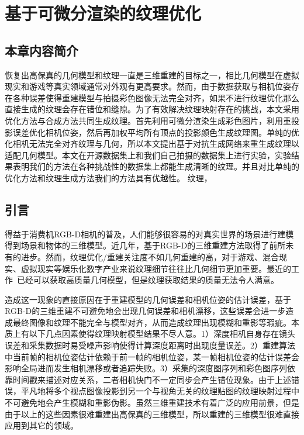 \chapter{基于可微分渲染的纹理优化}
\section{本章内容简介}

恢复出高保真的几何模型和纹理一直是三维重建的目标之一，相比几何模型在虚拟现实和游戏等真实领域通常对外观有更高要求。然而，由于数据获取与相机位姿存在各种误差使得重建模型与拍摄彩色图像无法完全对齐，如果不进行纹理优化那么直接生成的纹理会存在错位和缝隙。为了有效解决纹理映射存在的挑战，本文采用优化方法与合成方法共同生成纹理。首先利用可微分渲染生成彩色图片，利用重投影误差优化相机位姿，然后再加权平均所有顶点的投影颜色生成纹理图。单纯的优化相机无法完全对齐纹理与几何，所以本文提出基于对抗生成网络来重生成纹理以适配几何模型。本文在开源数据集上和我们自己拍摄的数据集上进行实验，实验结果表明我们的方法在各种挑战性的数据集上都能生成清晰的纹理。并且对比单纯的优化方法和纹理生成方法我们的方法具有优越性。
纹理，
\section{引言}
得益于消费机RGB-D相机的普及，人们能够很容易的对真实世界的场景进行建模得到场景和物体的三维模型。近几年，基于RGB-D的三维重建方法取得了前所未有的进步。然而，纹理优化/重建关注度不如几何重建的高，对于游戏、混合现实、虚拟现实等娱乐化数字产业来说纹理细节往往比几何细节更加重要。最近的工作~\cite{RichardNewcombe2011KinectFusionRD,ThomasWhelan2012KintinuousSE,ThomasWhelan2015ElasticFusionDS,SungjoonChoi2015RobustRO,VictorAdrianPrisacariu2017InfiniTAMVA,niessner2013real}已经可以获取高质量几何模型，但是纹理获取结果的质量无法令人满意。\par


造成这一现象的直接原因在于重建模型的几何误差和相机位姿的估计误差，基于RGB-D的三维重建不可避免地会出现几何误差和相机漂移，这些误差会进一步造成最终图像和纹理不能完全与模型对齐，从而造成纹理出现模糊和重影等瑕疵。本质上有以下几点因素使得纹理映射模型结果不尽人意。1）深度相机自身存在镜头误差和采集数据时易受噪声影响使得计算深度距离时出现度量误差。2）重建算法中当前帧的相机位姿估计依赖于前一帧的相机位姿，某一帧相机位姿的估计误差会影响全局进而发生相机漂移或者追踪失败。3）采集的深度图序列和彩色图序列依靠时间戳来描述对应关系，二者相机快门不一定同步会产生错位现象。由于上述错误，平凡地将多个视点图像投影到另一个与视角无关的纹理贴图的纹理映射过程中不可避免地会产生模糊和重影伪影。虽然三维重建技术有着广泛的应用前景，但是由于以上的这些因素很难重建出高保真的三维模型，所以重建的三维模型很难直接应用到其它的领域。\par

